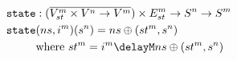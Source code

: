 \documentclass[preview]{standalone}
\begin{document}
\begin{align*}
  \texttt{state} &: (\wrapdf{V^m_{st} \times V^n \rightarrow V^m}) \times E^m_{st} \rightarrow S^n \rightarrow S^m \\
  \texttt{state} &(ns,i^m)(s^n) = ns \oplus (st^m, s^n) \\
                 &\text{where}\ st^m = i^m \delayM ns \oplus (st^m, s^n) 
\end{align*}
\end{document}
